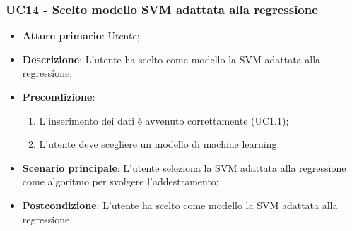 \subsubsection{UC14 - Scelto modello SVM adattata alla regressione}
\label{sssec:uc14}
\begin{itemize}
  \item \textbf{Attore primario}: Utente;
  \item \textbf{Descrizione}: L'utente ha scelto come modello la SVM adattata alla regressione;
  \item \textbf{Precondizione}:
  \begin{enumerate}
    \item L'inserimento dei dati è avvenuto correttamente (UC1.1);
    \item L'utente deve scegliere un modello di machine learning.
  \end{enumerate}
  \item \textbf{Scenario principale}: L'utente seleziona la SVM adattata alla regressione come algoritmo per svolgere l'addestramento;
  \item \textbf{Postcondizione}: L'utente ha scelto come modello la SVM adattata alla regressione.
\end{itemize}
